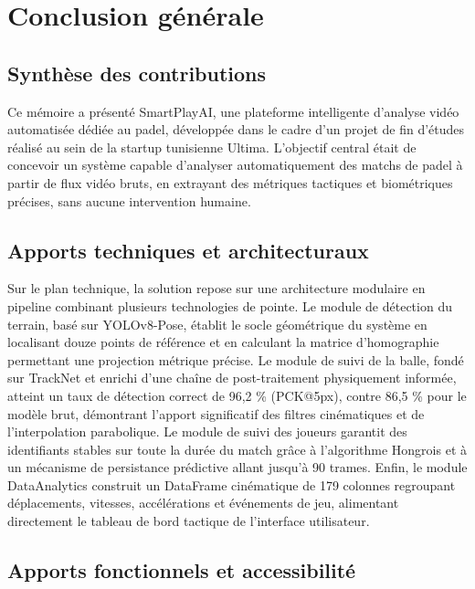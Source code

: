 \chapter*{Conclusion générale}

\section*{Synthèse des contributions}

Ce mémoire a présenté SmartPlayAI, une plateforme intelligente d'analyse vidéo automatisée dédiée au padel, développée dans le cadre d'un projet de fin d'études réalisé au sein de la startup tunisienne Ultima. L'objectif central était de concevoir un système capable d'analyser automatiquement des matchs de padel à partir de flux vidéo bruts, en extrayant des métriques tactiques et biométriques précises, sans aucune intervention humaine.

\section*{Apports techniques et architecturaux}

Sur le plan technique, la solution repose sur une architecture modulaire en pipeline combinant plusieurs technologies de pointe. Le module de détection du terrain, basé sur YOLOv8-Pose, établit le socle géométrique du système en localisant douze points de référence et en calculant la matrice d'homographie permettant une projection métrique précise. Le module de suivi de la balle, fondé sur TrackNet et enrichi d'une chaîne de post-traitement physiquement informée, atteint un taux de détection correct de 96,2 \% (PCK@5px), contre 86,5 \% pour le modèle brut, démontrant l'apport significatif des filtres cinématiques et de l'interpolation parabolique. Le module de suivi des joueurs garantit des identifiants stables sur toute la durée du match grâce à l'algorithme Hongrois et à un mécanisme de persistance prédictive allant jusqu'à 90 trames. Enfin, le module DataAnalytics construit un DataFrame cinématique de 179 colonnes regroupant déplacements, vitesses, accélérations et événements de jeu, alimentant directement le tableau de bord tactique de l'interface utilisateur.

\section*{Apports fonctionnels et accessibilité}

